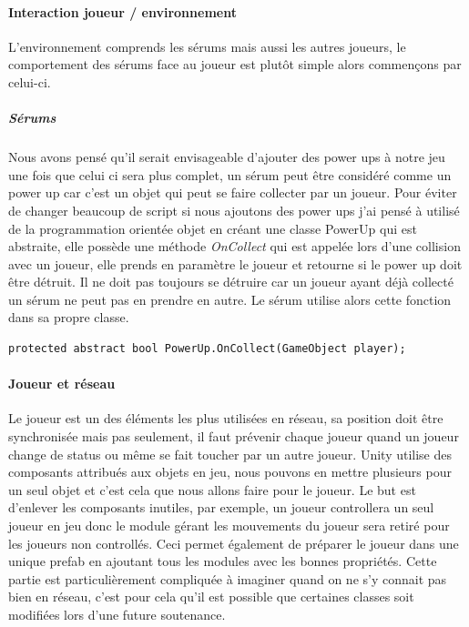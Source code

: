 \documentclass{article}
\begin{document}
\paragraph{Interaction joueur / environnement}

L'environnement comprends les sérums mais aussi les autres joueurs, le comportement des sérums face au joueur est plutôt simple alors commençons par celui-ci.

\subparagraph{Sérums}

Nous avons pensé qu'il serait envisageable d'ajouter des power ups à notre jeu une fois que celui ci sera plus complet, un sérum peut être considéré comme un power up car c'est un objet qui peut se faire collecter par un joueur. Pour éviter de changer beaucoup de script si nous ajoutons des power ups j'ai pensé à utilisé de la programmation orientée objet en créant une classe PowerUp qui est abstraite, elle possède une méthode \emph{OnCollect} qui est appelée lors d'une collision avec un joueur, elle prends en paramètre le joueur et retourne si le power up doit être détruit. Il ne doit pas toujours se détruire car un joueur ayant déjà collecté un sérum ne peut pas en prendre en autre. Le sérum utilise alors cette fonction dans sa propre classe.

\begin{lstlisting}
protected abstract bool PowerUp.OnCollect(GameObject player);
\end{lstlisting}

\paragraph{Joueur et réseau}

Le joueur est un des éléments les plus utilisées en réseau, sa position doit être synchronisée mais pas seulement, il faut prévenir chaque joueur quand un joueur change de status ou même se fait toucher par un autre joueur. Unity utilise des composants attribués aux objets en jeu, nous pouvons en mettre plusieurs pour un seul objet et c'est cela que nous allons faire pour le joueur. Le but est d'enlever les composants inutiles, par exemple, un joueur controllera un seul joueur en jeu donc le module gérant les mouvements du joueur sera retiré pour les joueurs non controllés. Ceci permet également de préparer le joueur dans une unique prefab en ajoutant tous les modules avec les bonnes propriétés.
Cette partie est particulièrement compliquée à imaginer quand on ne s'y connait pas bien en réseau, c'est pour cela qu'il est possible que certaines classes soit modifiées lors d'une future soutenance.
\end{document}
